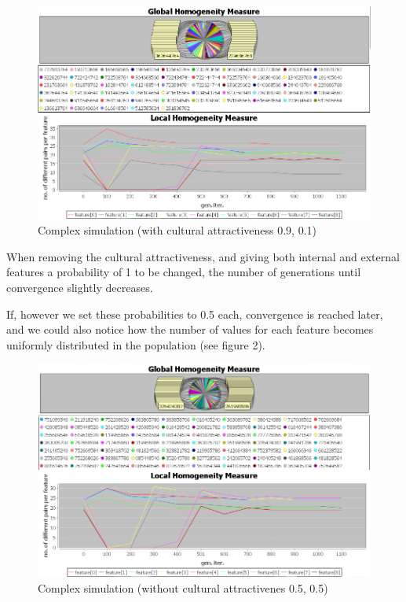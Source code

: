 \documentclass[twoside, 11pt, a4paper]{article}
\begin{document}
\begin{figure}[htp]
		\centering
		\includegraphics[width=\textwidth]{fig1}
		\caption{Complex simulation (with cultural attractiveness 0.9, 0.1)}
		\label{Fig 1}
\end{figure}

When removing the cultural attractiveness, and giving both internal and external features a probability of 1 to be changed, the number of generations until convergence slightly decreases.

If, however we set these probabilities to 0.5 each, convergence is reached later, and we could also notice how the number of values for each feature becomes uniformly distributed in the population (see figure 2).

\begin{figure}[htp]
		\centering
		\includegraphics[width=\textwidth]{fig2}
		\caption{Complex simulation (without cultural attractivenes 0.5, 0.5)}
		\label{Fig 2}
\end{figure}
\end{document}
